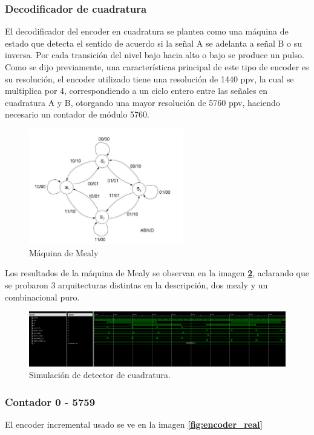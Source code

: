 \documentclass[11pt, a4paper]{article}
\begin{document}
	\subsubsection{Decodificador de cuadratura}
			El decodificador del encoder en cuadratura se plantea como una máquina de estado que detecta el sentido de acuerdo si la señal A se adelanta a señal B o su inversa. Por cada transición del nivel bajo hacia alto o bajo se produce un pulso. Como se dijo previamente, una características principal de este tipo de encoder es su resolución, el encoder utilizado tiene una resolución de 1440 ppv, la cual se multiplica por 4, correspondiendo a un ciclo entero entre las señales en cuadratura A y B, otorgando una mayor resolución de 5760 ppv, haciendo necesario un contador de módulo 5760.
		\begin{figure}[H]
			\centering
			\includegraphics[width=0.6\textwidth]{Imagenes/mealy.jpg}
			\caption{Máquina de Mealy}
			\label{fig:mealy}
		\end{figure} 
		
		Los resultados de la máquina de Mealy se observan en la imagen \textcolor{blue}{\textbf{\ref{fig:mealy_tb}}}, aclarando que se probaron 3 arquitecturas distintas en la descripción, dos mealy y un combinacional puro.

		\begin{figure}[H]
			\centering
			\includegraphics[width=\textwidth]{Imagenes/tb_mealy.png}
			\caption{Simulación de detector de cuadratura.}
			\label{fig:mealy_tb}
		\end{figure} 
\clearpage

	\subsubsection{Contador 0 - 5759}
			El encoder incremental usado se ve en la imagen \textcolor{blue}{\textbf{\ref{fig:encoder_real}}} 
\end{document}

